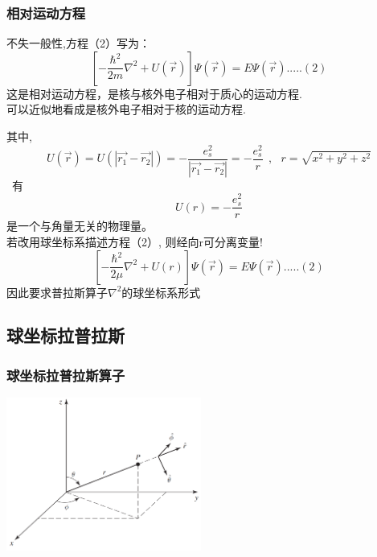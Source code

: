 \begin{frame}
	\frametitle{相对运动方程}
	不失一般性,方程（2）写为：
	\begin{equation*}
		\left[-\frac{\hbar^2}{2 m} \nabla ^2 +U(\vec{r}) \right] \Psi (\vec{r}) =E \Psi (\vec{r})   ..... (2)
	\end{equation*}
	这是相对运动方程，是核与核外电子相对于质心的运动方程.\\
	可以近似地看成是核外电子相对于核的运动方程.
\end{frame}	

\begin{frame}
	其中,
	\begin{equation*}
		U(\vec{r})=U(| \vec{r_1}-\vec{r_2} | )=-\frac{e_s ^2}{| \vec{r_1}-\vec{r_2} |} = -\frac{e_s ^2}{r} ~~,~~~ r =\sqrt{x^2+y^2+z^2}
	\end{equation*}
	 有
	\begin{equation*}
		U(r)=-\frac{e_s ^2}{r}
	\end{equation*}	
	是一个与角量无关的物理量。 \\
	若改用球坐标系描述方程（2）, 则经向r可分离变量!\\
	\begin{equation*}
		\left[-\frac{\hbar^2}{2 \mu} \nabla ^2 +U(r) \right] \Psi (\vec{r}) =E \Psi (\vec{r})   ..... (2)
	\end{equation*}
	因此要求普拉斯算子$\nabla ^2$的球坐标系形式
\end{frame}		

\subsection{球坐标拉普拉斯}

\begin{frame}
	\frametitle{球坐标拉普拉斯算子}
	\begin{center}
		   \includegraphics[width=0.48\textwidth]{figs/2022-03-28-22-51-18.png}
	\end{center}
\end{frame}

